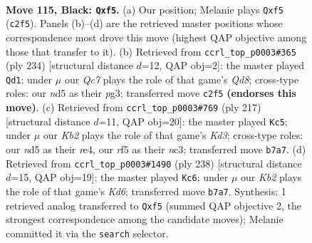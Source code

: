 \documentclass[11pt]{article}
\begin{document}
\clearpage

\begin{figure}[p]\centering
\begin{subfigure}{0.46\textwidth}\centering
\resizebox{\linewidth}{!}{%
\newchessgame
\chessboard[
  setfen={3B4/1k6/8/1K1N1R2/8/8/2q5/8 b - - 7 115},
  showmover=false,
  pgfstyle=straightmove, color=movearrow, markmove={c2-f5}
]}
\caption{}
\end{subfigure}\hfill
\begin{subfigure}{0.46\textwidth}\centering
\resizebox{\linewidth}{!}{%
\newchessgame
\chessboard[
  setfen={3Q4/6K1/8/7k/8/5rp1/8/8 w - - 0 118},
  showmover=false,
  pgfstyle=straightmove, color=movearrow, markmove={d8-d1}
]}
\caption{}
\end{subfigure}
\\[4pt]
\begin{subfigure}{0.46\textwidth}\centering
\resizebox{\linewidth}{!}{%
\newchessgame
\chessboard[
  setfen={8/8/3k4/8/2B1R3/2N5/2K5/q7 b - - 18 109},
  showmover=false,
  pgfstyle=straightmove, color=movearrow, markmove={d6-c5}
]}
\caption{}
\end{subfigure}\hfill
\begin{subfigure}{0.46\textwidth}\centering
\resizebox{\linewidth}{!}{%
\newchessgame
\chessboard[
  setfen={8/8/3K4/1r6/k7/8/4Q3/8 w - - 15 120},
  showmover=false,
  pgfstyle=straightmove, color=movearrow, markmove={d6-c6}
]}
\caption{}
\end{subfigure}
\caption{\textbf{Move 115, Black: \texttt{Qxf5}.} (a) Our position; Melanie plays \texttt{Qxf5} (\texttt{c2f5}). Panels (b)--(d) are the retrieved master positions whose correspondence most drove this move (highest QAP objective among those that transfer to it). (b) Retrieved from \texttt{ccrl\_top\_p0003\#365} (ply 234) [structural distance $d$=12, QAP obj=2]: the master played \texttt{Qd1}; under $\mu$ our \emph{Qc7} plays the role of that game's \emph{Qd8}; cross-type roles: our \emph{n}d5 as their \emph{p}g3; transferred move \texttt{c2f5} \textbf{(endorses this move)}. (c) Retrieved from \texttt{ccrl\_top\_p0003\#769} (ply 217) [structural distance $d$=11, QAP obj=20]: the master played \texttt{Kc5}; under $\mu$ our \emph{Kb2} plays the role of that game's \emph{Kd3}; cross-type roles: our \emph{n}d5 as their \emph{r}e4, our \emph{r}f5 as their \emph{n}c3; transferred move \texttt{b7a7}. (d) Retrieved from \texttt{ccrl\_top\_p0003\#1490} (ply 238) [structural distance $d$=15, QAP obj=19]: the master played \texttt{Kc6}; under $\mu$ our \emph{Kb2} plays the role of that game's \emph{Kd6}; transferred move \texttt{b7a7}. Synthesis: 1 retrieved analog transferred to \texttt{Qxf5} (summed QAP objective 2, the strongest correspondence among the candidate moves); Melanie committed it via the \texttt{search} selector.}
\label{fig:thought-m229}
\end{figure}
\end{document}
